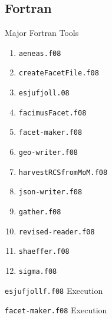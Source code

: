 \subsection{Fortran}
\begin{frame}[ allowframebreaks ]{Major Fortran Tools}
\begin{enumerate}
	\item \texttt{aeneas.f08}
	\item \texttt{createFacetFile.f08}
	\item \texttt{esjufjoll.08}
	\item \texttt{facimusFacet.f08}
	\item \texttt{facet-maker.f08}
	\item \texttt{geo-writer.f08}
	\item \texttt{harvestRCSfromMoM.f08}
	\item \texttt{json-writer.f08}
	\item \texttt{gather.f08}
	\item \texttt{revised-reader.f08}
	\item \texttt{shaeffer.f08}
	\item \texttt{sigma.f08}
\end{enumerate}
\end{frame}

\begin{frame}{\texttt{esjufjollf.f08} Execution}
\scriptsize

\end{frame}

\begin{frame}{\texttt{facet-maker.f08} Execution}
\scriptsize

\end{frame}

